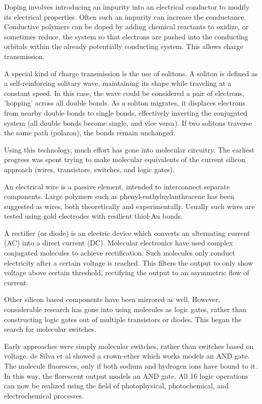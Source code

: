 \documentclass[12pt]{article}
\begin{document}
Doping involves introducing an impurity into an electrical conductor to modify its electrical properties. Often such an impurity can increase the conductance. Conductive polymers can be doped by adding chemical reactants to oxidize, or sometimes reduce, the system so that electrons are pushed into the conducting orbitals within the already potentially conducting system. This allows charge transmission. 

A special kind of charge transmission is the use of solitons. A soliton is defined as a self-reinforcing solitary wave, maintaining its shape while traveling at a constant speed. In this case, the wave could be considered a pair of electrons, 'hopping' across all double bonds. As a soliton migrates, it displaces electrons from nearby double bonds to single bonds, effectively inverting the conjugated system (all double bonds become single, and vice versa). If two solitons traverse the same path (polaron), the bonds remain unchanged.

Using this technology, much effort has gone into molecular circuitry. The earliest progress was spent trying to make molecular equivalents of the current silicon approach (wires, transistors, switches, and logic gates). 

An electrical wire is a passive element, intended to interconnect separate components. Large polymers such as phenyl-enthylnylanthracene has been suggested as wires, both theoretically and experimentally. Usually such wires are tested using gold electrodes with resilient thiol-Au bonds. 

A rectifier (or diode) is an electric device which converts an alternating current (AC) into a direct current (DC). Molecular electronics have used complex conjugated molecules to achieve rectification. Such molecules only conduct electricity after a certain voltage is reached. This filters the output to only show voltage above certain threshold, rectifying the output to an asymmetric flow of current. 

Other silicon based components have been mirrored as well. However, considerable research has gone into using molecules as logic gates, rather than constructing logic gates out of multiple transistors or diodes. This began the search for molecular switches. 

Early approaches were simply molecular switches, rather than switches based on voltage. de Silva et al showed a crown-ether which works models an AND gate. The molecule fluoresces, only if both sodium and hydrogen ions have bound to it. In this way, the florescent output models an AND gate. All 16 logic operations can now be realized using the field of photophysical, photochemical, and electrochemical processes. 
\end{document}
